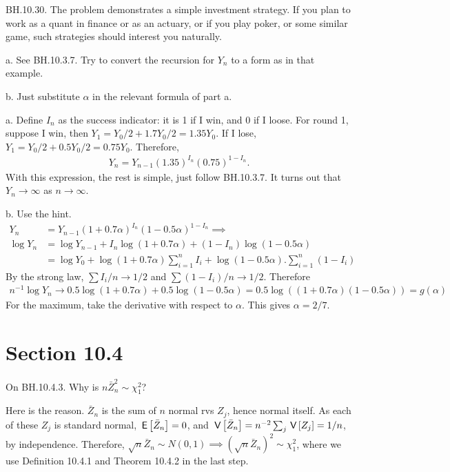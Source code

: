 \begin{exercise}
BH.10.30. The problem demonstrates a simple investment strategy.
If you plan to work as a quant in finance or as an actuary, or if you play poker, or some similar game, such strategies should interest you naturally.

\begin{hint}
a. See BH.10.3.7. Try to convert the recursion for $Y_n$ to a form as in that example.

b. Just substitute $\alpha$ in the relevant formula of part a.
\end{hint}
\begin{solution}
a. Define $I_n$ as the success indicator: it is 1 if I win, and 0 if I loose.  For round 1, suppose I win, then $Y_{1} = Y_0/2 + 1.7 Y_0/2= 1.35 Y_{0}$. If I lose,
$Y_{1} = Y_0/2 + 0.5 Y_0/2= 0.75 Y_{0}$. Therefore,
\begin{align*}
Y_n = Y_{n-1} (1.35)^{I_{n}}(0.75)^{1-I_{n}}.
\end{align*}
With this expression, the rest  is simple, just  follow  BH.10.3.7.
It turns out that $Y_n\to\infty$ as $n\to\infty$.

b. Use the hint.
\begin{align*}
Y_n &= Y_{n-1} (1+0.7\alpha)^{I_{n}}(1-0.5\alpha)^{1-I_{n}} \implies \\
\log Y_n &= \log Y_{n-1}  + I_{n} \log(1+0.7\alpha) + (1-I_{n})\log (1-0.5\alpha)  \\
& = \log Y_{0}  + \log(1+0.7\alpha) \sum_{i=1}^{n}I_{i}  + \log(1-0.5\alpha).\sum_{i=1}^{n} (1-I_{i})
\end{align*}
By the strong law, $\sum I_i/n \to 1/2$ and $\sum (1-I_{i})/n \to 1/2$. Therefore
\begin{align*}
n^{-1}\log Y_n \to 0.5 \log(1+0.7\alpha) + 0.5\log(1-0.5\alpha) = 0.5 \log( (1+0.7\alpha)(1-0.5\alpha)) = g(\alpha)
\end{align*}
For the maximum, take the derivative with respect to $\alpha$. This gives $\alpha=2/7$.
\end{solution}
\end{exercise}


\section{Section 10.4}
\label{sec:section-10.4}

\begin{exercise}
On BH.10.4.3. Why is $n \bar Z_n^2\sim \chi_1^2$?
\begin{hint}
\end{hint}
\begin{solution}
Here is the reason.
$\bar Z_n$ is the sum of $n$ normal rvs $Z_j$, hence normal itself.
As each of these $Z_j$ is standard normal, $\,\mathsf{E}\left[\bar Z_n\right]=0$, and $\,\mathsf{V}\left[\bar Z_n\right]=n^{-2}\sum_{j} \,\mathsf{V}\left[Z_{j}\right]=1/n$, by independence.
Therefore, $\sqrt{n} \bar Z_{n} \sim N(0,1) \implies (\sqrt{n}\bar Z_n)^2 \sim \chi_1^2$, where we use Definition 10.4.1 and Theorem 10.4.2 in the last step.
\end{solution}
\end{exercise}


